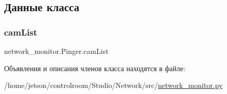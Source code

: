 \subsection{Данные класса}
\mbox{\label{classnetwork__monitor_1_1_pinger_a9e16cc56e9483b16869dccd9b87045d9}} 
\subsubsection{\texorpdfstring{cam\+List}{camList}}
{\footnotesize\ttfamily network\+\_\+monitor.\+Pinger.\+cam\+List}



Объявления и описания членов класса находятся в файле\+:\begin{DoxyCompactItemize}
\item 
/home/jetson/controlroom/\+Studio/\+Network/src/\hyperlink{network__monitor_8py}{network\+\_\+monitor.\+py}\end{DoxyCompactItemize}
